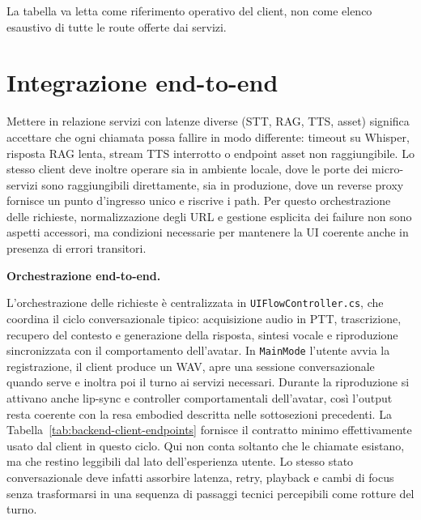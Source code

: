 \noindent La tabella va letta come riferimento operativo del client, non come elenco esaustivo di tutte le route offerte dai servizi.
\endgroup
\FloatBarrier

\clearpage

\section{Integrazione end-to-end}
\label{sec:integrazione}
\begingroup
\setlength{\emergencystretch}{3em}
\hfuzz=200pt
\sloppy

Mettere in relazione servizi con latenze diverse (STT, RAG, TTS, asset) significa accettare che ogni chiamata possa fallire in modo differente: timeout su Whisper, risposta RAG lenta, stream TTS interrotto o endpoint asset non raggiungibile. Lo stesso client deve inoltre operare sia in ambiente locale, dove le porte dei micro-servizi sono raggiungibili direttamente, sia in produzione, dove un reverse proxy fornisce un punto d'ingresso unico e riscrive i path. Per questo orchestrazione delle richieste, normalizzazione degli URL e gestione esplicita dei failure non sono aspetti accessori, ma condizioni necessarie per mantenere la UI coerente anche in presenza di errori transitori.

\noindent\textbf{Orchestrazione end-to-end.}
\label{subsec:orchestrazione}\label{subsec:normalizzazione-endpoint}\label{subsec:error-retry-fallback}

L'orchestrazione delle richieste è centralizzata in \texttt{UIFlowController.cs}, che coordina il ciclo conversazionale tipico: acquisizione audio in PTT, trascrizione, recupero del contesto e generazione della risposta, sintesi vocale e riproduzione sincronizzata con il comportamento dell'avatar. In \texttt{MainMode} l'utente avvia la registrazione, il client produce un WAV, apre una sessione conversazionale quando serve e inoltra poi il turno ai servizi necessari. Durante la riproduzione si attivano anche lip-sync e controller comportamentali dell'avatar, così l'output resta coerente con la resa embodied descritta nelle sottosezioni precedenti. La Tabella~\ref{tab:backend-client-endpoints} fornisce il contratto minimo effettivamente usato dal client in questo ciclo. Qui non conta soltanto che le chiamate esistano, ma che restino leggibili dal lato dell'esperienza utente. Lo stesso stato conversazionale deve infatti assorbire latenza, retry, playback e cambi di focus senza trasformarsi in una sequenza di passaggi tecnici percepibili come rotture del turno.

